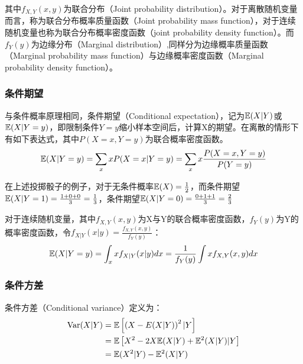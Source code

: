\documentclass[11pt]{article}
\begin{document}
其中$f_{X,Y}(x,y)$为联合分布（Joint probability distribution）。对于离散随机变量而言，称为联合分布概率质量函数（Joint probability mass function），对于连续随机变量也称为联合分布概率密度函数（joint probability density function）。而$f_Y(y)$为边缘分布（Marginal distribution）,同样分为边缘概率质量函数（Marginal probability mass function）与边缘概率密度函数（Marginal probability density function）。

\subsubsection{条件期望}

与条件概率原理相同，条件期望（Conditional expectation），记为$\mathbb{E}(X|Y)$或$\mathbb{E}(X|Y=y)$，即限制条件$Y=y$缩小样本空间后，计算X的期望。在离散的情形下有如下表达式，其中$P(X=x,Y=y)$为联合概率密度函数。
\begin{equation*}
    \mathbb{E}(X|Y=y) = \sum_x x P(X=x|Y=y) = \sum_x x \frac{P(X=x,Y=y)}{P(Y=y)}
\end{equation*}

\begin{example}
    在上述投掷骰子的例子，对于无条件概率$\mathbb{E}(X) = \frac{1}{2}$，而条件期望$\mathbb{E}(X|Y=1) = \frac{1+0+0}{3} = \frac{1}{3}$，条件期望$\mathbb{E}(X|Y=0) = \frac{0+1+1}{3} = \frac{2}{3}$
\end{example}

对于连续随机变量，其中$f_{X,Y}(x,y)$为X与Y的联合概率密度函数，$f_Y(y)$为Y的概率密度函数，令$f_{X|Y}(x|y) = \frac{f_{X,Y}(x,y)}{f_Y(y)}$：
\begin{equation*}
    \mathbb{E}(X|Y=y) = \int_x x f_{X|Y}(x|y) dx = \frac{1}{f_Y(y)} \int x f_{X,Y}(x,y) dx
\end{equation*}

\subsubsection{条件方差}

条件方差（Conditional variance）定义为：
\begin{align*}
    \operatorname{Var}(X|Y) &= \mathbb{E} \left[\left( X-E(X|Y) \right)^2 |Y \right] \\
    &= \mathbb{E} \left[ X^2 - 2X\mathbb{E}(X|Y) + \mathbb{E}^2(X|Y) |Y \right] \\
    &= \mathbb{E} (X^2|Y) - \mathbb{E}^2(X|Y)
\end{align*}
\end{document}
